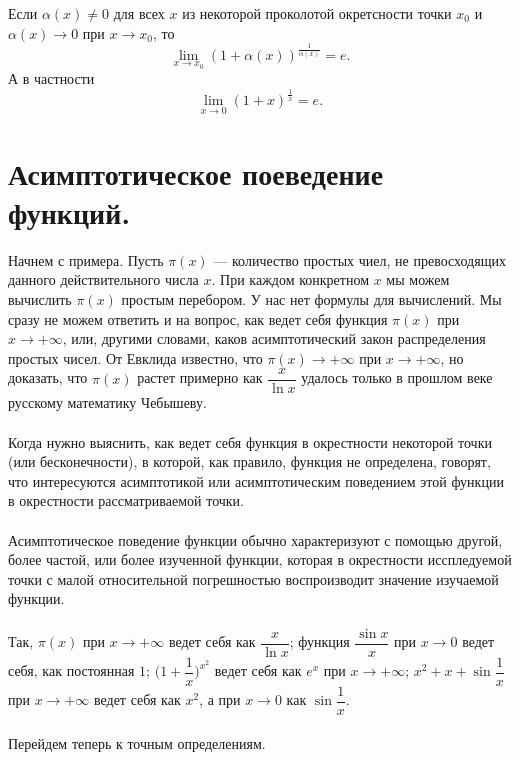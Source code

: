 \begin{corollary}
	Если $\alpha(x) \ne 0$ для всех $x$ из некоторой проколотой окретсности точки $x_0$ и $\alpha(x)\to 0$ при $x\to x_0$, то 
	$$\lim\limits_{x\to x_0}(1 + \alpha(x))^{\frac{1}{\alpha(x)}} = e.$$
	А в частности 
	$$\lim\limits_{x\to 0}(1 + x)^{\frac{1}{x}} = e.$$
\end{corollary}
\section{Асимптотическое поеведение функций.}
Начнем с примера. Пусть $\pi (x)$ --- количество простых чиел, не превосходящих данного действительного числа $x$. При каждом конкретном $x$ мы можем вычислить $\pi (x)$ простым перебором. У нас нет формулы для вычислений. Мы сразу не можем ответить и на вопрос, как ведет себя функция $\pi (x)$ при $x\to +\infty$, или, другими словами, каков асимптотический закон распределения простых чисел. От Евклида известно, что $\pi(x) \to +\infty$ при $x \to +\infty$, но доказать, что $\pi (x)$ растет примерно как $\dfrac{x}{\ln x}$ удалось только в прошлом веке русскому математику Чебышеву.\\\\
Когда нужно выяснить, как ведет себя функция в окрестности некоторой точки (или бесконечности), в которой, как правило, функция не определена, говорят, что интересуются асимптотикой или асимптотическим поведением этой функции в окрестности рассматриваемой точки.\\\\
Асимптотическое поведение функции обычно характеризуют с помощью другой, более частой, или более изученной функции, которая в окрестности исспледуемой точки с малой относительной погрешностью воспроизводит значение изучаемой функции.\\\\
Так, $\pi (x)$ при $x \to +\infty$ ведет себя как $\dfrac{x}{\ln x}$; функция $\dfrac{\sin x}{x}$ при $x \to 0$ ведет себя, как постоянная $1$; $\Big(1 + \dfrac{1}{x}\Big)^{x^2}$ ведет себя как $e^x$ при $x \to +\infty$; $x^2 + x + \sin \dfrac{1}{x}$ при $x \to +\infty$ ведет себя как $x^2$, а при $x \to 0$ как $\sin \dfrac{1}{x}$.\\\\
Перейдем теперь к точным определениям.
